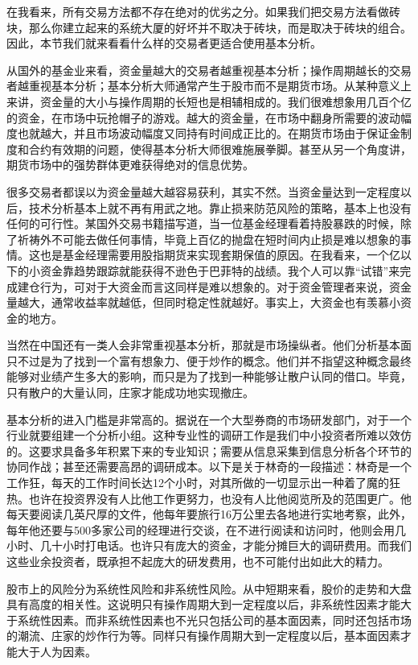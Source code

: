 在我看来，所有交易方法都不存在绝对的优劣之分。如果我们把交易方法看做砖块，那么你建立起来的系统大厦的好坏并不取决于砖块，而是取决于砖块的组合。因此，本节我们就来看看什么样的交易者更适合使用基本分析。

从国外的基金业来看，资金量越大的交易者越重视基本分析；操作周期越长的交易者越重视基本分析；基本分析大师通常产生于股市而不是期货市场。从某种意义上来讲，资金量的大小与操作周期的长短也是相辅相成的。我们很难想象用几百个亿的资金，在市场中玩抢帽子的游戏。越大的资金量，在市场中翻身所需要的波动幅度也就越大，并且市场波动幅度又同持有时间成正比的。在期货市场由于保证金制度和合约有效期的问题，使得基本分析大师很难施展拳脚。甚至从另一个角度讲，期货市场中的强势群体更难获得绝对的信息优势。

很多交易者都误以为资金量越大越容易获利，其实不然。当资金量达到一定程度以后，技术分析基本上就不再有用武之地。靠止损来防范风险的策略，基本上也没有任何的可行性。某国外交易书籍描写道，当一位基金经理看着持股暴跌的时候，除了祈祷外不可能去做任何事情，毕竟上百亿的抛盘在短时间内止损是难以想象的事情。这也是基金经理需要用股指期货来实现套期保值的原因。在我看来，一个亿以下的小资金靠趋势跟踪就能获得不逊色于巴菲特的战绩。我个人可以靠“试错”来完成建仓行为，可对于大资金而言这同样是难以想象的。对于资金管理者来说，资金量越大，通常收益率就越低，但同时稳定性就越好。事实上，大资金也有羡慕小资金的地方。

当然在中国还有一类人会非常重视基本分析，那就是市场操纵者。他们分析基本面只不过是为了找到一个富有想象力、便于炒作的概念。他们并不指望这种概念最终能够对业绩产生多大的影响，而只是为了找到一种能够让散户认同的借口。毕竟，只有散户的大量认同，庄家才能成功地实现撤庄。

基本分析的进入门槛是非常高的。据说在一个大型券商的市场研发部门，对于一个行业就要组建一个分析小组。这种专业性的调研工作是我们中小投资者所难以效仿的。这要求具备多年积累下来的专业知识；需要从信息采集到信息分析各个环节的协同作战；甚至还需要高昂的调研成本。以下是关于林奇的一段描述：林奇是一个工作狂，每天的工作时间长达12个小时，对其所做的一切显示出一种着了魔的狂热。也许在投资界没有人比他工作更努力，也没有人比他阅览所及的范围更广。他每天要阅读几英尺厚的文件，他每年要旅行16万公里去各地进行实地考察，此外，每年他还要与500多家公司的经理进行交谈，在不进行阅读和访问时，他则会用几小时、几十小时打电话。也许只有庞大的资金，才能分摊巨大的调研费用。而我们这些业余投资者，既承担不起庞大的研发费用，也不可能付出如此大的精力。

股市上的风险分为系统性风险和非系统性风险。从中短期来看，股价的走势和大盘具有高度的相关性。这说明只有操作周期大到一定程度以后，非系统性因素才能大于系统性因素。而非系统性因素也不光只包括公司的基本面因素，同时还包括市场的潮流、庄家的炒作行为等。同样只有操作周期大到一定程度以后，基本面因素才能大于人为因素。


